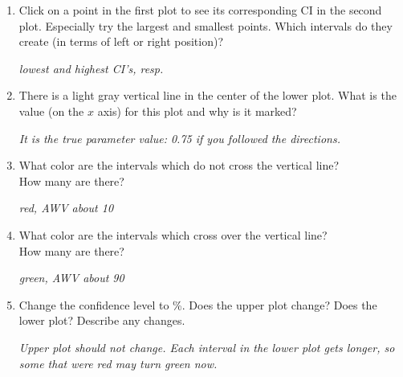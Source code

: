   \begin{enumerate}
      \item   Click on a point in the first plot to see its corresponding CI in
  the second plot.  Especially try the largest and smallest points.
  Which intervals do they create (in terms of left or right position)?
\begin{students}
  \vspace{1cm}
\end{students}
\begin{key}
  {\it lowest and highest CI's, resp.}
\end{key}
\item There is a light gray vertical line in the center of the lower
  plot. What is the value (on the $x$ axis) for this plot and why is
  it marked?
\begin{students}
  \vspace{1cm}
\end{students}
\begin{key}
  {\it It is the true parameter value: 0.75 if you followed the directions.}
\end{key}
\item What color are the intervals which do not cross the vertical
  line? \\How many are there?
\begin{students}
  \vspace{1cm}
\end{students}

\begin{key}
  {\it red, AWV about 10}
\end{key}

\item What color are the intervals which cross over the vertical
  line? \\How many are there?
\begin{students}
  \vspace{1cm}
\end{students}

\begin{key}
  {\it green, AWV about 90}
\end{key}

\item Change the confidence level to \%. Does the upper plot
  change?  Does the lower plot?  Describe any changes.
\begin{students}
  \vspace{1cm}
\end{students}
\begin{key}
  {\it Upper plot should not change. Each interval in the lower plot
    gets longer, so some that were red may turn green now.}
\end{key}



\end{enumerate}
